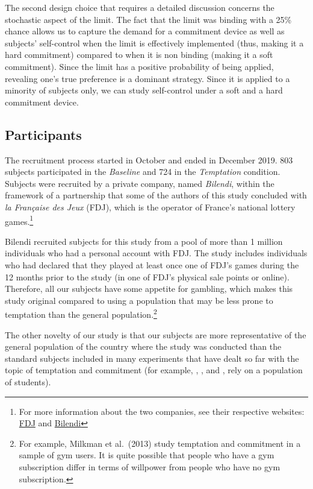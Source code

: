 \documentclass[
]{book}
\begin{document}
The second design choice that requires a detailed discussion concerns the stochastic aspect of the limit.
The fact that the limit was binding with a 25\% chance allows us to capture the demand for a commitment device as well as subjects' self-control when the limit is effectively implemented (thus, making it a hard commitment) compared to when it is non binding (making it a soft commitment).
Since the limit has a positive probability of being applied, revealing one's true preference is a dominant strategy.
Since it is applied to a minority of subjects only, we can study self-control under a soft and a hard commitment device.

\hypertarget{participants}{%
\subsection{Participants}\label{participants}}

The recruitment process started in October and ended in December 2019.
803 subjects participated in the \emph{Baseline} and 724 in the \emph{Temptation} condition.
Subjects were recruited by a private company, named \emph{Bilendi}, within the framework of a partnership that some of the authors of this study concluded with \emph{la Française des Jeux} (FDJ), which is the operator of France's national lottery games.\footnote{For more information about the two companies, see their respective websites: \href{https://www.fdj.fr/}{FDJ} and \href{https://www.bilendi.fr/}{Bilendi}}

Bilendi recruited subjects for this study from a pool of more than 1 million individuals who had a personal account with FDJ.
The study includes individuals who had declared that they played at least once one of FDJ's games during the 12 months prior to the study (in one of FDJ's physical sale points or online).
Therefore, all our subjects have some appetite for gambling, which makes this
study original compared to using a population that may be less prone to
temptation than the general population.\footnote{For example, Milkman et al.~(2013) study temptation and commitment in a sample of gym users.
  It is quite possible that people who have a gym subscription differ in terms of willpower from people who have no gym subscription.}

The other novelty of our study is that our subjects are more representative of the general population of the country where the study was conducted than the standard subjects included in many experiments that have dealt so far with the topic of temptation and commitment (for example, \citet{ariely2002procrastination}, \citet{casari2009pre}, and \citet{houser2018temptation}, rely on a population of students).
\end{document}
